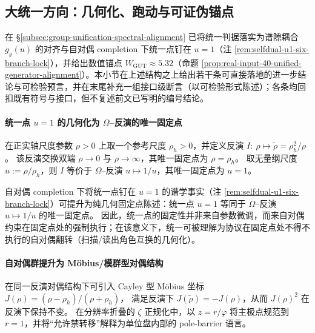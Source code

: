 \subsection{大统一方向：几何化、跑动与可证伪锚点}\label{subsec:group-unification-gut-forward}

在 \S\ref{subsec:group-unification-spectral-alignment} 已将统一判据落实为谱隙耦合 \(g_{\varrho}(u)\) 的对齐与自对偶 completion 下统一点钉在 \(u=1\)（注 \ref{rem:selfdual-u1-six-branch-lock}），并给出数值锚点 \(W_{\mathrm{GUT}}\approx 5.32\)（命题 \ref{prop:real-input-40-unified-generator-alignment}）。本小节在上述结构之上给出若干条可直接落地的进一步结论与可检验预言，并在末尾补充一组接口级断言（以可检验形式陈述）；各条均回扣既有符号与接口，但不复述前文已写明的编号结论。

\paragraph{统一点 \(u=1\) 的几何化为 \(\Omega\)--反演的唯一固定点}
在正实轴尺度参数 \(\rho>0\) 上取一个参考尺度 \(\rho_h>0\)，并定义反演
\(
I:\ \rho\mapsto\tilde\rho=\rho_h^2/\rho
\)。
该反演交换双端 \(\rho\to 0\) 与 \(\rho\to\infty\)，其唯一固定点为 \(\rho=\rho_h\)。
取无量纲尺度 \(u:=\rho/\rho_h\)，则 \(I\) 等价于 \(\Omega\)--反演 \(u\mapsto 1/u\)，其唯一固定点为 \(u=1\)。

\begin{proposition}[统一点与反演固定点的同一]\label{prop:u1-throat-identity}
自对偶 completion 下将统一点钉在 \(u=1\) 的谱学事实（注 \ref{rem:selfdual-u1-six-branch-lock}）可提升为纯几何固定点陈述：统一点 \(u=1\) 等同于 \(\Omega\)--反演 \(u\mapsto 1/u\) 的唯一固定点。
因此，统一点的固定性并非来自参数微调，而来自对偶约束在固定点处的强制执行；在该意义下，统一可被理解为协议在固定点处不得不执行的自对偶翻转（扫描/读出角色互换的几何化）。
\end{proposition}

\paragraph{自对偶群提升为 Möbius/模群型对偶结构}
在同一反演对偶结构下可引入 Cayley 型 Möbius 坐标
\(
J(\rho)=(\rho-\rho_h)/(\rho+\rho_h)
\)，
满足反演下 \(J(\tilde\rho)=-J(\rho)\)，从而 \(J(\rho)^2\) 在反演下保持不变。
在分辨率折叠的 \(\zeta\) 正规化中，以 \(z=r/\varphi\) 将主极点规范到 \(r=1\)，并将“允许禁转移”解释为单位盘内部的 pole-barrier 语言。

